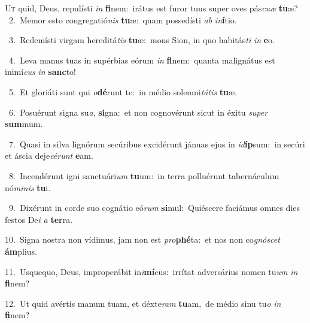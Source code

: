 \lettrine{\initial\textcolor{\initialcolor}{U}}{t} quid, Deus, repulísti \textit{in} \textbf{fi}\-nem:~\star irátus est furor tuus super oves pás\-\textit{cu}\-\textit{æ} \textbf{tu}\-æ?\\
{\numbfont\textcolor{\numbcolor}{~2.}}~Memor esto congregatió\textit{nis} \textbf{tu}\-æ:~\star quam possedísti \textit{ab} \textit{in}\-\textbf{í}tio.\par
{\numbfont\textcolor{\numbcolor}{~3.}}~Redemísti virgam hereditá\textit{tis} \textbf{tu}\-æ:~\star mons Sion, in quo habitás\textit{ti} \textit{in} \textbf{e}\-o.\par
{\numbfont\textcolor{\numbcolor}{~4.}}~Leva manus tuas in supérbias eórum \textit{in} \textbf{fi}\-nem:~\star quanta malignátus est inimí\textit{cus} \textit{in} \textbf{sanc}\-to!\par
{\numbfont\textcolor{\numbcolor}{~5.}}~Et gloriáti sunt qui \textit{o}\-\textbf{dé}runt te:~\star in médio solemni\-\textit{tá}\-\textit{tis} \textbf{tu}\-æ.\par
{\numbfont\textcolor{\numbcolor}{~6.}}~Posuérunt signa su\-\textit{a}\-, \textbf{si}\-gna:~\star et non cognovérunt sicut in éxitu \textit{su}\-\textit{per} \textbf{sum}\-mum.\par
{\numbfont\textcolor{\numbcolor}{~7.}}~Quasi in silva lignórum secúribus excidérunt jánuas ejus in \textit{id}\-\textbf{íp}sum:~\star in secúri et áscia deje\-\textit{cé}\-\textit{runt} \textbf{e}\-am.\par
{\numbfont\textcolor{\numbcolor}{~8.}}~Incendérunt igni sanctuári\textit{um} \textbf{tu}\-um:~\star in terra polluérunt tabernáculum nó\-\textit{mi}\-\textit{nis} \textbf{tu}\-i.\par
{\numbfont\textcolor{\numbcolor}{~9.}}~Dixérunt in corde suo cognátio eó\textit{rum} \textbf{si}\-mul:~\star Quiéscere faciámus omnes dies festos De\textit{i} \textit{a} \textbf{ter}\-ra.\par
{\numbfont\textcolor{\numbcolor}{10.}}~Signa nostra non vídimus, jam non est \textit{pro}\-\textbf{phé}ta:~\star et nos non co\-\textit{gnó}\-\textit{scet} \textbf{ám}\-plius.\par
{\numbfont\textcolor{\numbcolor}{11.}}~Usquequo, Deus, improperábit in\-\textit{i}\-\textbf{mí}cus:~\star irrítat adversárius nomen tu\textit{um} \textit{in} \textbf{fi}\-nem?\par
{\numbfont\textcolor{\numbcolor}{12.}}~Ut quid avértis manum tuam, et déxte\textit{ram} \textbf{tu}\-am,~\star de médio sinu tu\textit{o} \textit{in} \textbf{fi}\-nem?\par
